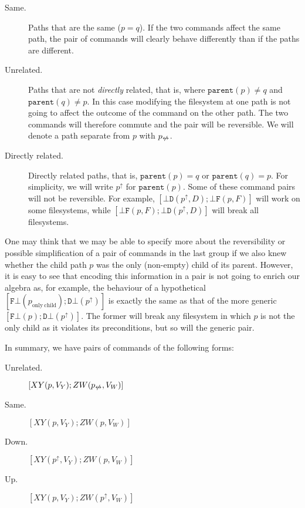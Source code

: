\documentclass[12pt]{article}
\newcommand{\empt}{\bot}
\newcommand{\parent}{\mathtt{parent}}
\newcommand{\pp}{p^\uparrow} %
\newcommand{\np}{p_{\centernot\leftrightarrow}} %
\newcommand{\fscommand}[2]{{#1#2}}
\newcommand{\fsregcommandchar}[1]{\mathtt{#1}}
\newcommand{\fsregcommand}[2]{\fscommand{\fsregcommandchar{#1}}{\fsregcommandchar{#2}}}
\newcommand{\cbf}{\fsregcommand{\empt}{F}}
\newcommand{\cbd}{\fsregcommand{\empt}{D}}
\newcommand{\cfb}{\fsregcommand{F}{\empt}}
\newcommand{\cdb}{\fsregcommand{D}{\empt}}
\newcommand{\cxy}{\fscommand{X}{Y}}
\newcommand{\czw}{\fscommand{Z}{W}}
\theoremstyle{definition}
\begin{document}
\begin{description}
\item[Same.] Paths that are the same ($p=q$). If the two commands affect the same path, the pair of commands
will clearly behave differently than if the paths are different.
%
\item[Unrelated.] Paths that are not \emph{directly} related,
that is, where $\parent(p)\neq q$ and $\parent(q)\neq p$. 
In this case modifying the filesystem at one path is not going
to affect the outcome of the command on the other path.
The two commands will therefore commute and the pair will be reversible.
We will denote a path separate from $p$ with $\np$.
%
\item[Directly related.] Directly related paths, that is, $\parent(p)=q$ or $\parent(q)=p$.
For simplicity, we will write $\pp$ for $\parent(p)$.
Some of these command pairs will not be reversible.
For example, $[\cbd(\pp,D);\cbf(p,F)]$ will work on some filesystems,
while $[\cbf(p,F);\cbd(\pp,D)]$ will break all filesystems.
\end{description}

One may think that we may be able to specify more about the reversibility
or possible simplification of a pair of commands in the last group if we also
knew whether the child path $p$ was the only (non-empty) child of its parent.
However, it is easy to see that encoding this information in a pair
is not going to enrich our algebra as, for example,
the behaviour of a hypothetical $[\cfb(p_{\mathrm{only\ child}}); \cdb(\pp)]$
is exactly the same as that of the more generic
$[\cfb(p); \cdb(\pp)]$. The former will break any filesystem in which
$p$ is not the only child as it violates its preconditions, but so will
the generic pair.


In summary, we have pairs of commands
of the following forms:
\begin{description}
\item[Unrelated.] \( [\cxy(p,V_Y); \czw(\np,V_W)] \)
\item[Same.] \( [\cxy(p,V_Y); \czw(p,V_W)] \)
\item[Down.] \( [\cxy(\pp,V_Y); \czw(p,V_W)] \)
\item[Up.] \( [\cxy(p,V_Y); \czw(\pp,V_W)] \)
\end{description}

\end{document}

